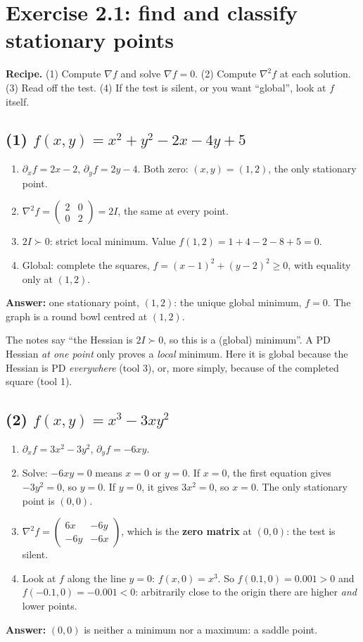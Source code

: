 \section{Exercise 2.1: find and classify stationary points \lvl{$\bullet\circ\circ$}}

\textbf{Recipe.} (1) Compute $\nabla f$ and solve $\nabla f=0$. (2) Compute $\nabla^2f$ at each solution. (3) Read off the test. (4) If the test is silent, or you want ``global'', look at $f$ itself.

\subsection*{(1) $f(x,y)=x^2+y^2-2x-4y+5$}
\begin{enumerate}
  \item $\partial_xf=2x-2$, $\partial_yf=2y-4$. Both zero: $(x,y)=(1,2)$, the only stationary point.
  \item $\nabla^2f=\begin{pmatrix}2&0\\0&2\end{pmatrix}=2I$, the same at every point.
  \item $2I\succ0$: strict local minimum. Value $f(1,2)=1+4-2-8+5=0$.
  \item Global: complete the squares, $f=(x-1)^2+(y-2)^2\ge0$, with equality only at $(1,2)$.
\end{enumerate}
\textbf{Answer:} one stationary point, $(1,2)$: the unique global minimum, $f=0$. The graph is a round bowl centred at $(1,2)$.

\begin{pitfall}
The notes say ``the Hessian is $2I\succ0$, so this is a (global) minimum''. A PD Hessian \emph{at one point} only proves a \emph{local} minimum.
Here it is global because the Hessian is PD \emph{everywhere} (tool 3), or, more simply, because of the completed square (tool 1).
\end{pitfall}

\subsection*{(2) $f(x,y)=x^3-3xy^2$}
\begin{enumerate}
  \item $\partial_xf=3x^2-3y^2$, $\partial_yf=-6xy$.
  \item Solve: $-6xy=0$ means $x=0$ or $y=0$. If $x=0$, the first equation gives $-3y^2=0$, so $y=0$. If $y=0$, it gives $3x^2=0$, so $x=0$. The only stationary point is $(0,0)$.
  \item $\nabla^2f=\begin{pmatrix}6x&-6y\\-6y&-6x\end{pmatrix}$, which is the \textbf{zero matrix} at $(0,0)$: the test is silent.
  \item Look at $f$ along the line $y=0$: $f(x,0)=x^3$. So $f(0.1,0)=0.001>0$ and $f(-0.1,0)=-0.001<0$: arbitrarily close to the origin there are higher \emph{and} lower points.
\end{enumerate}
\textbf{Answer:} $(0,0)$ is neither a minimum nor a maximum: a saddle point.

